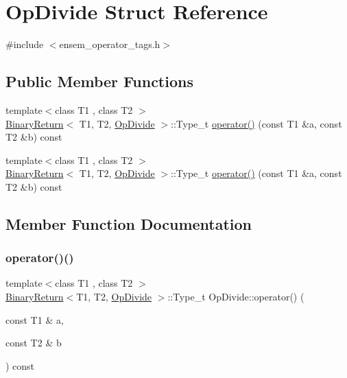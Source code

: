 \hypertarget{structOpDivide}{}\section{Op\+Divide Struct Reference}
\label{structOpDivide}


{\ttfamily \#include $<$ensem\+\_\+operator\+\_\+tags.\+h$>$}

\subsection*{Public Member Functions}
\begin{DoxyCompactItemize}
\item 
{\footnotesize template$<$class T1 , class T2 $>$ }\\\mbox{\hyperlink{structBinaryReturn}{Binary\+Return}}$<$ T1, T2, \mbox{\hyperlink{structOpDivide}{Op\+Divide}} $>$\+::Type\+\_\+t \mbox{\hyperlink{structOpDivide_ae41ed8850cb38437e1b709a890e2fd79}{operator()}} (const T1 \&a, const T2 \&b) const
\item 
{\footnotesize template$<$class T1 , class T2 $>$ }\\\mbox{\hyperlink{structBinaryReturn}{Binary\+Return}}$<$ T1, T2, \mbox{\hyperlink{structOpDivide}{Op\+Divide}} $>$\+::Type\+\_\+t \mbox{\hyperlink{structOpDivide_ae41ed8850cb38437e1b709a890e2fd79}{operator()}} (const T1 \&a, const T2 \&b) const
\end{DoxyCompactItemize}


\subsection{Member Function Documentation}
\mbox{\label{structOpDivide_ae41ed8850cb38437e1b709a890e2fd79}} 
\subsubsection{\texorpdfstring{operator()()}{operator()()}\hspace{0.1cm}{\footnotesize\ttfamily [1/2]}}
{\footnotesize\ttfamily template$<$class T1 , class T2 $>$ \\
\mbox{\hyperlink{structBinaryReturn}{Binary\+Return}}$<$T1, T2, \mbox{\hyperlink{structOpDivide}{Op\+Divide}} $>$\+::Type\+\_\+t Op\+Divide\+::operator() (\begin{DoxyParamCaption}\item[{const T1 \&}]{a,  }\item[{const T2 \&}]{b }\end{DoxyParamCaption}) const\hspace{0.3cm}{\ttfamily [inline]}}

